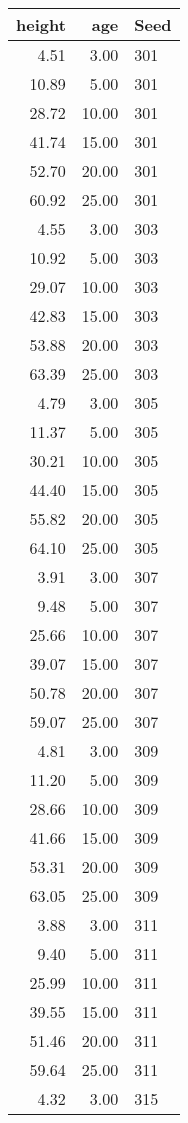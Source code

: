 \documentclass[10pt, fullpage, a4paper, titlepage]{article}
\begin{document}
\begin{longtable}{rrl}
  \hline
height & age & Seed \\ 
  \hline
4.51 & 3.00 & 301 \\ 
  10.89 & 5.00 & 301 \\ 
  28.72 & 10.00 & 301 \\ 
  41.74 & 15.00 & 301 \\ 
  52.70 & 20.00 & 301 \\ 
  60.92 & 25.00 & 301 \\ 
  4.55 & 3.00 & 303 \\ 
  10.92 & 5.00 & 303 \\ 
  29.07 & 10.00 & 303 \\ 
  42.83 & 15.00 & 303 \\ 
  53.88 & 20.00 & 303 \\ 
  63.39 & 25.00 & 303 \\ 
  4.79 & 3.00 & 305 \\ 
  11.37 & 5.00 & 305 \\ 
  30.21 & 10.00 & 305 \\ 
  44.40 & 15.00 & 305 \\ 
  55.82 & 20.00 & 305 \\ 
  64.10 & 25.00 & 305 \\ 
  3.91 & 3.00 & 307 \\ 
  9.48 & 5.00 & 307 \\ 
  25.66 & 10.00 & 307 \\ 
  39.07 & 15.00 & 307 \\ 
  50.78 & 20.00 & 307 \\ 
  59.07 & 25.00 & 307 \\ 
  4.81 & 3.00 & 309 \\ 
  11.20 & 5.00 & 309 \\ 
  28.66 & 10.00 & 309 \\ 
  41.66 & 15.00 & 309 \\ 
  53.31 & 20.00 & 309 \\ 
  63.05 & 25.00 & 309 \\ 
  3.88 & 3.00 & 311 \\ 
  9.40 & 5.00 & 311 \\ 
  25.99 & 10.00 & 311 \\ 
  39.55 & 15.00 & 311 \\ 
  51.46 & 20.00 & 311 \\ 
  59.64 & 25.00 & 311 \\ 
  4.32 & 3.00 & 315 \\ 

\end{longtable}
\end{document}
